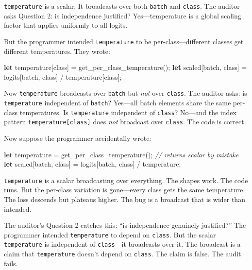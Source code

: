 \documentclass[11pt,titlepage]{article}
\newenvironment{Shaded}{}{}
\newcommand{\CommentTok}[1]{\textcolor[rgb]{0.38,0.63,0.69}{\textit{#1}}}
\newcommand{\KeywordTok}[1]{\textcolor[rgb]{0.00,0.44,0.13}{\textbf{#1}}}
\newcommand{\NormalTok}[1]{#1}
\newcommand{\OperatorTok}[1]{\textcolor[rgb]{0.40,0.40,0.40}{#1}}
\begin{document}
\texttt{temperature} is a scalar. It broadcasts over both \texttt{batch}
and \texttt{class}. The auditor asks Question 2: is independence
justified? Yes---temperature is a global scaling factor that applies
uniformly to all logits.

But the programmer intended \texttt{temperature} to be
per-class---different classes get different temperatures. They wrote:

\begin{Shaded}
\begin{Highlighting}[]
\KeywordTok{let}\NormalTok{ temperature}\OperatorTok{[}\NormalTok{class}\OperatorTok{]}\NormalTok{ = get_per_class_temperature();}
\KeywordTok{let}\NormalTok{ scaled}\OperatorTok{[}\NormalTok{batch, class}\OperatorTok{]}\NormalTok{ = logits}\OperatorTok{[}\NormalTok{batch, class}\OperatorTok{]}\NormalTok{ / temperature}\OperatorTok{[}\NormalTok{class}\OperatorTok{]}\NormalTok{;}
\end{Highlighting}
\end{Shaded}

Now \texttt{temperature} broadcasts over \texttt{batch} but \emph{not}
over \texttt{class}. The auditor asks: is \texttt{temperature}
independent of \texttt{batch}? Yes---all batch elements share the same
per-class temperatures. Is \texttt{temperature} independent of
\texttt{class}? No---and the index pattern
\texttt{temperature{[}class{]}} does \emph{not} broadcast over
\texttt{class}. The code is correct.

Now suppose the programmer accidentally wrote:

\begin{Shaded}
\begin{Highlighting}[]
\KeywordTok{let}\NormalTok{ temperature = get_per_class_temperature();  }\CommentTok{// returns scalar by mistake}
\KeywordTok{let}\NormalTok{ scaled}\OperatorTok{[}\NormalTok{batch, class}\OperatorTok{]}\NormalTok{ = logits}\OperatorTok{[}\NormalTok{batch, class}\OperatorTok{]}\NormalTok{ / temperature;}
\end{Highlighting}
\end{Shaded}

\texttt{temperature} is a scalar broadcasting over everything. The
shapes work. The code runs. But the per-class variation is gone---every
class gets the same temperature. The loss descends but plateaus higher.
The bug is a broadcast that is wider than intended.

The auditor's Question 2 catches this: ``is independence genuinely
justified?'' The programmer intended \texttt{temperature} to depend on
\texttt{class}. But the scalar \texttt{temperature} is independent of
\texttt{class}---it broadcasts over it. The broadcast is a claim that
\texttt{temperature} doesn't depend on \texttt{class}. The claim is
false. The audit fails.
\end{document}
